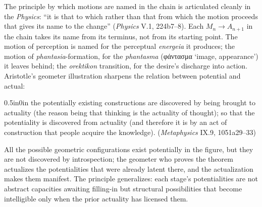 \documentclass{article}
\newcommand{\gk}[1]{{\greekfont #1}}
\begin{document}
The principle by which motions are named in the chain is articulated cleanly in the \textit{Physics}: ``it is that to which rather than that from which the motion proceeds that gives its name to the change'' (\textit{Physics} V.1, 224b7--8). Each $M_n \rightarrow A_{n+1}$ in the chain takes its name from its terminus, not from its starting point. The motion of perception is named for the perceptual \textit{energeia} it produces; the motion of \textit{phantasia}-formation, for the \textit{phantasma} (\gk{φάντασμα} `image, appearance') it leaves behind; the \textit{orektikon} transition, for the desire's discharge into action. Aristotle's geometer illustration sharpens the relation between potential and actual:
\begin{adjustwidth}{0.5in}{0in}
the potentially existing constructions are discovered by being brought to actuality (the reason being that thinking is the actuality of thought); so that the potentiality is discovered from actuality (and therefore it is by an act of construction that people acquire the knowledge). (\textit{Metaphysics} IX.9, 1051a29--33)
\end{adjustwidth}
All the possible geometric configurations exist potentially in the figure, but they are not discovered by introspection; the geometer who proves the theorem actualizes the potentialities that were already latent there, and the actualization makes them manifest. The principle generalizes: each stage's potentialities are not abstract capacities awaiting filling-in but structural possibilities that become intelligible only when the prior actuality has licensed them.
\end{document}
